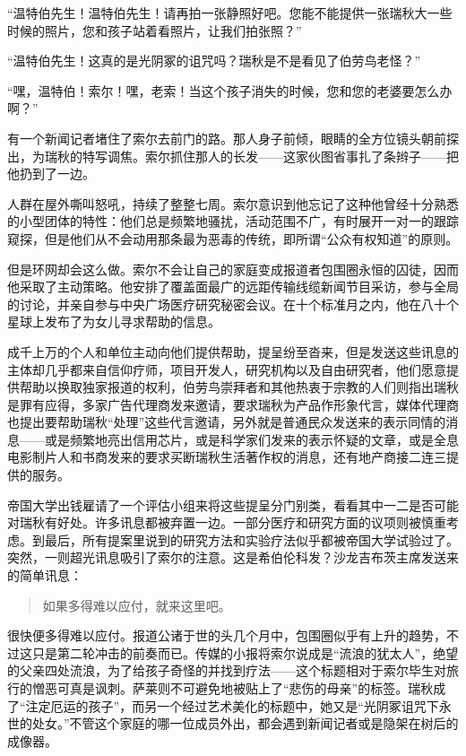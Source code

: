 \documentclass[AutoFakeBold=true]{book}
\begin{document}
``温特伯先生！温特伯先生！请再拍一张静照好吧。您能不能提供一张瑞秋大一些时候的照片，您和孩子站着看照片，让我们拍张照？''

``温特伯先生！这真的是光阴冢的诅咒吗？瑞秋是不是看见了伯劳鸟老怪？''

``嘿，温特伯！索尔！嘿，老索！当这个孩子消失的时候，您和您的老婆要怎么办啊？''

有一个新闻记者堵住了索尔去前门的路。那人身子前倾，眼睛的全方位镜头朝前探出，为瑞秋的特写调焦。索尔抓住那人的长发——这家伙图省事扎了条辫子——把他扔到了一边。

人群在屋外嘶叫怒吼，持续了整整七周。索尔意识到他忘记了这种他曾经十分熟悉的小型团体的特性：他们总是频繁地骚扰，活动范围不广，有时展开一对一的跟踪窥探，但是他们从不会动用那条最为恶毒的传统，即所谓``公众有权知道''的原则。

但是环网却会这么做。索尔不会让自己的家庭变成报道者包围圈永恒的囚徒，因而他采取了主动策略。他安排了覆盖面最广的远距传输线缆新闻节目采访，参与全局的讨论，并亲自参与中央广场医疗研究秘密会议。在十个标准月之内，他在八十个星球上发布了为女儿寻求帮助的信息。

成千上万的个人和单位主动向他们提供帮助，提呈纷至沓来，但是发送这些讯息的主体却几乎都来自信仰疗师，项目开发人，研究机构以及自由研究者，他们愿意提供帮助以换取独家报道的权利，伯劳鸟崇拜者和其他热衷于宗教的人们则指出瑞秋是罪有应得，多家广告代理商发来邀请，要求瑞秋为产品作形象代言，媒体代理商也提出要帮助瑞秋``处理''这些代言邀请，另外就是普通民众发送来的表示同情的消息——或是频繁地亮出信用芯片，或是科学家们发来的表示怀疑的文章，或是全息电影制片人和书商发来的要求买断瑞秋生活著作权的消息，还有地产商接二连三提供的服务。

帝国大学出钱雇请了一个评估小组来将这些提呈分门别类，看看其中一二是否可能对瑞秋有好处。许多讯息都被弃置一边。一部分医疗和研究方面的议项则被慎重考虑。到最后，所有提案里说到的研究方法和实验疗法似乎都被帝国大学试验过了。突然，一则超光讯息吸引了索尔的注意。这是希伯伦科发？沙龙吉布茨主席发送来的简单讯息：

\begin{quotation}
	\begin{center}{\heiti 如果多得难以应付，就来这里吧。}\end{center}
\end{quotation}

很快便多得难以应付。报道公诸于世的头几个月中，包围圈似乎有上升的趋势，不过这只是第二轮冲击的前奏而已。传媒的小报将索尔说成是``流浪的犹太人''，绝望的父亲四处流浪，为了给孩子奇怪的并找到疗法——这个标题相对于索尔毕生对旅行的憎恶可真是讽刺。萨莱则不可避免地被贴上了``悲伤的母亲''的标签。瑞秋成了``注定厄运的孩子''，而另一个经过艺术美化的标题中，她又是``光阴冢诅咒下永世的处女。''不管这个家庭的哪一位成员外出，都会遇到新闻记者或是隐架在树后的成像器。
\end{document}
